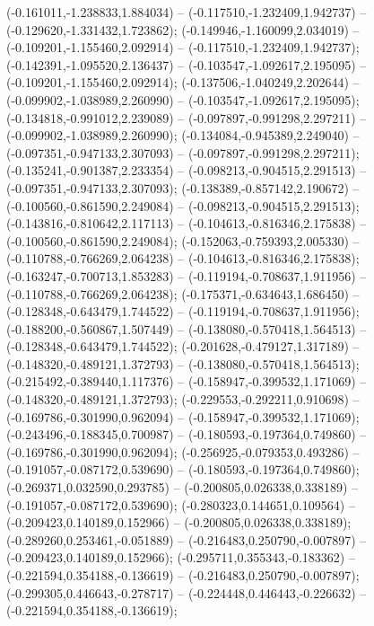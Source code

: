  (-0.161011,-1.238833,1.884034) -- (-0.117510,-1.232409,1.942737) -- (-0.129620,-1.331432,1.723862);
 (-0.149946,-1.160099,2.034019) -- (-0.109201,-1.155460,2.092914) -- (-0.117510,-1.232409,1.942737);
 (-0.142391,-1.095520,2.136437) -- (-0.103547,-1.092617,2.195095) -- (-0.109201,-1.155460,2.092914);
 (-0.137506,-1.040249,2.202644) -- (-0.099902,-1.038989,2.260990) -- (-0.103547,-1.092617,2.195095);
 (-0.134818,-0.991012,2.239089) -- (-0.097897,-0.991298,2.297211) -- (-0.099902,-1.038989,2.260990);
 (-0.134084,-0.945389,2.249040) -- (-0.097351,-0.947133,2.307093) -- (-0.097897,-0.991298,2.297211);
 (-0.135241,-0.901387,2.233354) -- (-0.098213,-0.904515,2.291513) -- (-0.097351,-0.947133,2.307093);
 (-0.138389,-0.857142,2.190672) -- (-0.100560,-0.861590,2.249084) -- (-0.098213,-0.904515,2.291513);
 (-0.143816,-0.810642,2.117113) -- (-0.104613,-0.816346,2.175838) -- (-0.100560,-0.861590,2.249084);
 (-0.152063,-0.759393,2.005330) -- (-0.110788,-0.766269,2.064238) -- (-0.104613,-0.816346,2.175838);
 (-0.163247,-0.700713,1.853283) -- (-0.119194,-0.708637,1.911956) -- (-0.110788,-0.766269,2.064238);
 (-0.175371,-0.634643,1.686450) -- (-0.128348,-0.643479,1.744522) -- (-0.119194,-0.708637,1.911956);
 (-0.188200,-0.560867,1.507449) -- (-0.138080,-0.570418,1.564513) -- (-0.128348,-0.643479,1.744522);
 (-0.201628,-0.479127,1.317189) -- (-0.148320,-0.489121,1.372793) -- (-0.138080,-0.570418,1.564513);
 (-0.215492,-0.389440,1.117376) -- (-0.158947,-0.399532,1.171069) -- (-0.148320,-0.489121,1.372793);
 (-0.229553,-0.292211,0.910698) -- (-0.169786,-0.301990,0.962094) -- (-0.158947,-0.399532,1.171069);
 (-0.243496,-0.188345,0.700987) -- (-0.180593,-0.197364,0.749860) -- (-0.169786,-0.301990,0.962094);
 (-0.256925,-0.079353,0.493286) -- (-0.191057,-0.087172,0.539690) -- (-0.180593,-0.197364,0.749860);
 (-0.269371,0.032590,0.293785) -- (-0.200805,0.026338,0.338189) -- (-0.191057,-0.087172,0.539690);
 (-0.280323,0.144651,0.109564) -- (-0.209423,0.140189,0.152966) -- (-0.200805,0.026338,0.338189);
 (-0.289260,0.253461,-0.051889) -- (-0.216483,0.250790,-0.007897) -- (-0.209423,0.140189,0.152966);
 (-0.295711,0.355343,-0.183362) -- (-0.221594,0.354188,-0.136619) -- (-0.216483,0.250790,-0.007897);
 (-0.299305,0.446643,-0.278717) -- (-0.224448,0.446443,-0.226632) -- (-0.221594,0.354188,-0.136619);
